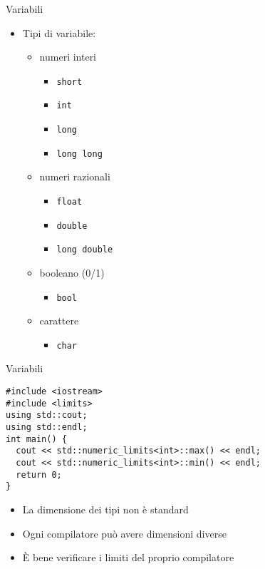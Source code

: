 \begin{frame}[fragile]{Variabili}
  \vfill
  \begin{itemize}
    \item Tipi di variabile:
    \begin{itemize}
      \item numeri interi
      \begin{itemize}
          \item \lstinline$short$
          \item \lstinline$int$
          \item \lstinline$long$
          \item \lstinline$long long$
      \end{itemize}
        \item numeri razionali
        \begin{itemize}
            \item \lstinline$float$
            \item \lstinline$double$
            \item \lstinline$long double$
        \end{itemize}
      \item booleano (0/1)
      \begin{itemize}
        \item \lstinline$bool$
      \end{itemize}
      \item carattere
      \begin{itemize}
        \item \lstinline$char$
      \end{itemize}
    \end{itemize}
  \end{itemize}
  \vfill
\end{frame}

\begin{frame}[fragile]{Variabili}
  \vfill
  \begin{lstlisting}
#include <iostream>
#include <limits>
using std::cout;
using std::endl;
int main() {
  cout << std::numeric_limits<int>::max() << endl;
  cout << std::numeric_limits<int>::min() << endl;
  return 0;
}
  \end{lstlisting}
  \vfill
  \begin{itemize}
    \item La dimensione dei tipi non è standard
    \vfill
    \item Ogni compilatore può avere dimensioni diverse
    \vfill
    \item È bene verificare i limiti del proprio compilatore
  \end{itemize}
  \vfill
\end{frame}

